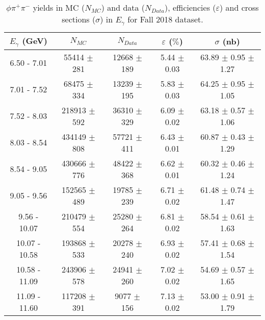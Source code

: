 \begin{center}
\null
\vfill
\begin{table}[H]
    \centering
    \caption{$\phi \pi^{+}\pi^{-}$ yields in MC ($N_{MC}$) and data ($N_{Data}$), efficiencies ($\varepsilon$) and cross sections ($\sigma$) in $E_{\gamma}$ for Fall 2018 dataset.}
    \label{tab.xsec_ul.phi2pi.4.1}
    \begin{tabular}{|c|c|c|c|c|}
    \hline
    $E_{\gamma}$ (GeV) & $N_{MC}$ & $N_{Data}$ & $\varepsilon$ ($\%$) & $\sigma$ (nb) \\ 
    \hline
    6.50 - 7.01 & 55414 $\pm$ 281 & 12668 $\pm$ 189 & 5.44 $\pm$ 0.03 & 63.89 $\pm$ 0.95 $\pm$ 1.27 \\ 
    7.01 - 7.52 & 68475 $\pm$ 334 & 13239 $\pm$ 195 & 5.83 $\pm$ 0.03 & 64.25 $\pm$ 0.95 $\pm$ 1.05 \\ 
    7.52 - 8.03 & 218913 $\pm$ 592 & 36310 $\pm$ 329 & 6.09 $\pm$ 0.02 & 63.18 $\pm$ 0.57 $\pm$ 1.06 \\ 
    8.03 - 8.54 & 434149 $\pm$ 808 & 57721 $\pm$ 411 & 6.43 $\pm$ 0.01 & 60.87 $\pm$ 0.43 $\pm$ 1.29 \\ 
    8.54 - 9.05 & 430666 $\pm$ 776 & 48422 $\pm$ 368 & 6.62 $\pm$ 0.01 & 60.32 $\pm$ 0.46 $\pm$ 1.24 \\ 
    9.05 - 9.56 & 152565 $\pm$ 489 & 19785 $\pm$ 239 & 6.71 $\pm$ 0.02 & 61.48 $\pm$ 0.74 $\pm$ 1.47 \\ 
    9.56 - 10.07 & 210479 $\pm$ 554 & 25280 $\pm$ 264 & 6.81 $\pm$ 0.02 & 58.54 $\pm$ 0.61 $\pm$ 1.63 \\ 
    10.07 - 10.58 & 193868 $\pm$ 533 & 20278 $\pm$ 240 & 6.93 $\pm$ 0.02 & 57.41 $\pm$ 0.68 $\pm$ 1.54 \\ 
    10.58 - 11.09 & 243906 $\pm$ 578 & 24941 $\pm$ 260 & 7.02 $\pm$ 0.02 & 54.69 $\pm$ 0.57 $\pm$ 1.65 \\ 
    11.09 - 11.60 & 117208 $\pm$ 391 & 9077 $\pm$ 156 & 7.13 $\pm$ 0.02 & 53.00 $\pm$ 0.91 $\pm$ 1.79 \\ 
   \hline
\end{tabular}
\end{table}
\end{center}

